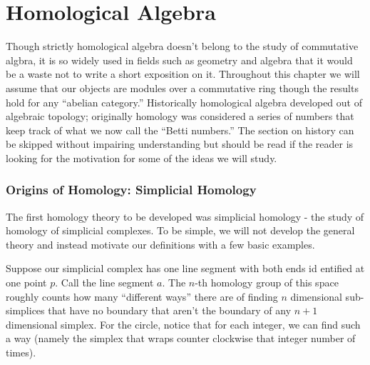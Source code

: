 \chapter{Homological Algebra} 

Though strictly homological algebra doesn't
belong to the study of commutative algbra, it is so widely used in fields
such as geometry and algebra that it would be a waste not to write a short
exposition on it. Throughout this chapter we will assume that our objects are
modules over a commutative ring though the results hold for any ``abelian
category.'' Historically homological algebra developed out of algebraic
topology; originally homology was considered a series of numbers that keep
track of what we now call the ``Betti numbers.'' The section on history can
be skipped without impairing understanding but should be read if the reader
is looking for the motivation for some of the ideas we will study.

\subsection{Origins of Homology: Simplicial Homology}

The first homology theory
to be developed was simplicial homology - the study of homology of simplicial
complexes. To be simple, we will not develop the general theory and instead
motivate our definitions with a few basic examples.  

\begin{example} Suppose
our simplicial complex has one line segment with both ends id entified at
one point $p$. Call the line segment $a$. The $n$-th homology group of this
space roughly counts how many ``different ways'' there are of finding $n$
dimensional sub-simplices that have no boundary that aren't the boundary of
any $n+1$ dimensional simplex. For the circle, notice that for each integer,
we can find such a way (namely the simplex that wraps counter clockwise that
integer number of times).
\end{example}
